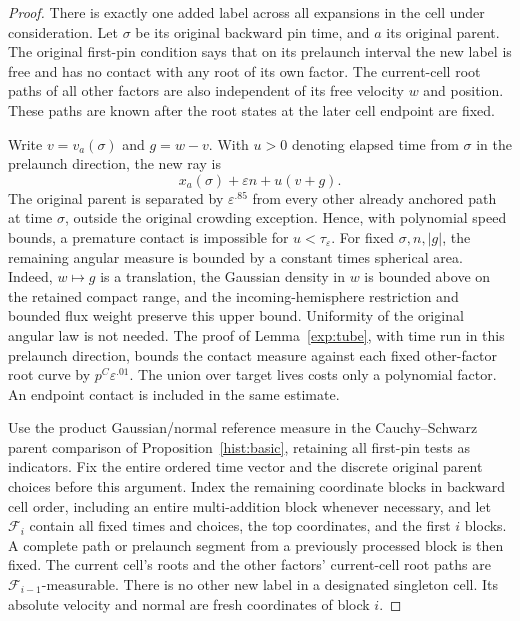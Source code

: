 \begin{proof}
There is exactly one added label across all expansions in the cell under
consideration.  Let $\sigma$ be its original backward pin time, and $a$ its
original parent.  The original first-pin condition says that on its
prelaunch interval the new label is free and has no contact with any root
of its own factor.  The current-cell root paths of all other factors are
also independent of its free velocity $w$ and position.  These paths are
known after the root states at the later cell endpoint are fixed.

Write $v=v_a(\sigma)$ and $g=w-v$.  With $u>0$ denoting elapsed time from
$\sigma$ in the prelaunch direction, the new ray is
\[
 x_a(\sigma)+\varepsilon n+u(v+g).
\]
The original parent is separated by $\varepsilon^{.85}$ from every other
already anchored path at time $\sigma$, outside the original crowding
exception.  Hence, with polynomial speed bounds, a premature contact is
impossible for $u<\tau_\varepsilon$.  For fixed $\sigma,n,|g|$, the remaining
angular measure is bounded by a constant times spherical area.  Indeed,
$w\mapsto g$ is a translation, the Gaussian density in $w$ is bounded
above on the retained compact range, and the incoming-hemisphere
restriction and bounded flux weight preserve this upper bound.
Uniformity of the original angular law is not needed.  The proof
of Lemma~\ref{exp:tube}, with time run in this prelaunch direction, bounds
the contact measure against each fixed other-factor root curve by
$p^C\varepsilon^{.01}$.  The union over target lives costs only a polynomial
factor.  An endpoint contact is included in the same estimate.

Use the product Gaussian/normal reference measure in the
Cauchy--Schwarz parent comparison of Proposition~\ref{hist:basic}, retaining all
first-pin tests as indicators.  Fix the entire ordered time vector and
the discrete original parent choices before this argument.  Index the
remaining coordinate blocks in backward cell order, including an entire
multi-addition block whenever necessary, and let $\mathcal F_i$ contain
all fixed times and choices, the top coordinates, and the first $i$ blocks.
A complete path or prelaunch segment from a previously processed block is
then fixed.  The current cell's roots and the other factors' current-cell
root paths are $\mathcal F_{i-1}$-measurable.  There is no other new label
in a designated singleton cell.  Its absolute velocity and normal are
fresh coordinates of block $i$.


\end{proof}
